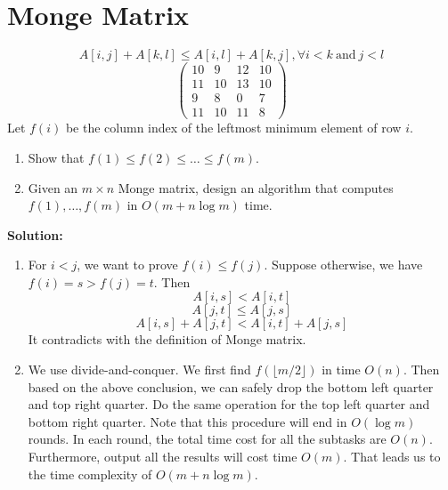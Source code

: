 

\section{Monge Matrix}
\[
A[i,j] + A[k,l] \le A[i,l]+A[k,j], \forall i<k\ \text{and}\ j<l
\]
\[\begin{pmatrix}
10 & 9 & 12 & 10\\
11 & 10 & 13 & 10\\
9 & 8 & 0 & 7\\
11 & 10 & 11 & 8
\end{pmatrix}\]
Let $f(i)$ be the column index of the leftmost minimum element of row $i$.
\begin{enumerate}
\item Show that $f(1)\le f(2)\le \dots\le f(m)$.
\item Given an $m\times n$ Monge matrix, design an algorithm that computes $f(1),\dots,f(m)$ in $O(m+n\log m)$ time.
\end{enumerate}
{\bf Solution:}
\begin{enumerate}
\item For $i < j$, we want to prove $f(i) \le f(j)$. Suppose otherwise, we have $f(i) = s > f(j) = t$. Then 
\[
A[i,s] < A[i,t]
\]
\[
A[j,t] \le A[j,s]
\]
\[
A[i,s] + A[j,t] < A[i,t] + A[j,s]
\]
It contradicts with the definition of Monge matrix.
\item We use divide-and-conquer. We first find $f(\lfloor m/2\rfloor)$ in time $O(n)$. Then based on the above conclusion, we can safely drop the bottom left quarter and top right quarter. Do the same operation for the top left quarter and bottom right quarter. Note that this procedure will end in $O(\log m)$ rounds. In each round, the total time cost for all the subtasks are $O(n)$. Furthermore, output all the results will cost time $O(m)$. That leads us to the time complexity of $O(m+ n\log m)$.
\end{enumerate}